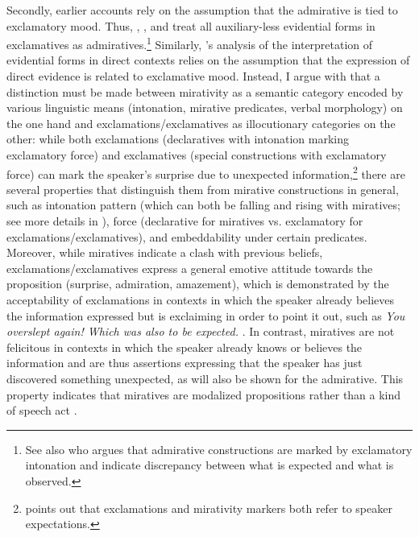 \documentclass[output=paper,
colorlinks,
citecolor=brown,
newtxmath
]{langscibook}
\begin{document}
Secondly, earlier accounts rely on the assumption that the admirative is tied to exclamatory mood. Thus, \citet{Aleksova2003}, \citet{Simeonova2015}, and \citet{Sonnenhauser2015} treat all auxiliary-less evidential forms in exclamatives as admiratives.\footnote{See also \citet{Guentcheva2017} who argues that admirative constructions are marked by exclamatory intonation and indicate discrepancy between what is expected and what is observed.} Similarly, \citeauthor{Smirnova2013}'s analysis of the interpretation of evidential forms in direct contexts relies on the assumption that the expression of direct evidence is related to exclamative mood. Instead, I argue with \citet{Bustamante2013} that a distinction must be made between mirativity as a semantic category encoded by various linguistic means (intonation, mirative predicates, verbal morphology) on the one hand and exclamations/exclamatives as illocutionary categories on the other: while both exclamations (declaratives with intonation marking exclamatory force) and exclamatives (special constructions with exclamatory force) can mark the speaker's surprise due to unexpected information,\footnote{\citet{Rett2011} points out that exclamations and mirativity markers both refer to speaker expectations.} there are several properties that distinguish them from mirative constructions in general, such as intonation pattern (which can both be falling and rising with miratives; see more details in \citealt[152-153]{Bustamante2013}), force (declarative for miratives vs. exclamatory for exclamations/exclamatives), and embeddability under certain predicates. Moreover, while miratives indicate a clash with previous beliefs, %
exclamations/exclamatives express a general emotive attitude towards the proposition (surprise, admiration, amazement), which is demonstrated by the acceptability of exclamations in contexts in which the speaker already believes the information expressed but is exclaiming in order to point it out, such as \textit{You overslept again! Which was also to be expected.} \citep[149, 154--155]{Bustamante2013}. In contrast, miratives are not felicitous in contexts in which the speaker already knows or believes the information and are thus
assertions expressing that the speaker has just discovered something unexpected, as will also be shown for the  admirative. This property indicates that miratives are modalized propositions rather than a kind of speech act \citep[159]{Bustamante2013}.
\end{document}
